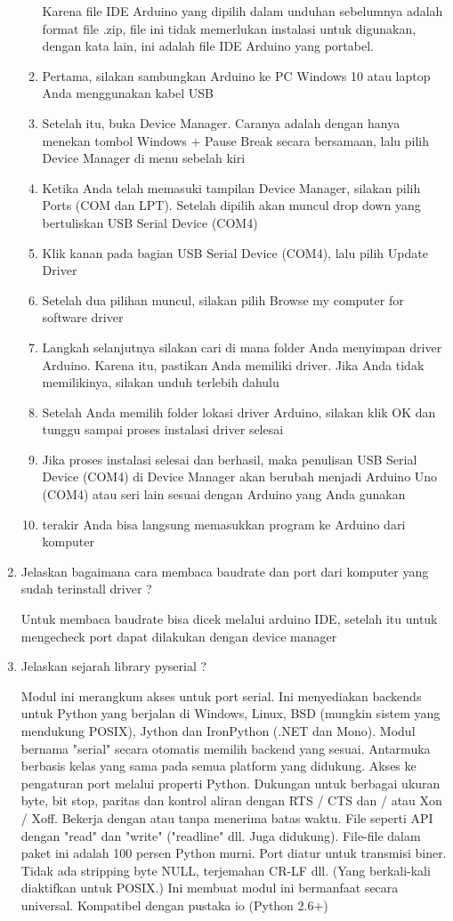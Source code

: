 \begin{enumerate}
\begin{enumerate}
Karena file IDE Arduino yang dipilih dalam unduhan sebelumnya adalah format file .zip, file ini tidak memerlukan instalasi untuk digunakan, dengan kata lain, ini adalah file IDE Arduino yang portabel.
\item Pertama, silakan sambungkan Arduino ke PC Windows 10 atau laptop Anda menggunakan kabel USB
\item Setelah itu, buka Device Manager. Caranya adalah dengan hanya menekan tombol Windows + Pause Break secara bersamaan, lalu pilih Device Manager di menu sebelah kiri
\item Ketika Anda telah memasuki tampilan Device Manager, silakan pilih Ports (COM dan LPT). Setelah dipilih akan muncul drop down yang bertuliskan USB Serial Device (COM4)
\item Klik kanan pada bagian USB Serial Device (COM4), lalu pilih Update Driver
\item Setelah dua pilihan muncul, silakan pilih Browse my computer for software driver
\item Langkah selanjutnya silakan cari di mana folder Anda menyimpan driver Arduino. Karena itu, pastikan Anda memiliki driver. Jika Anda tidak memilikinya, silakan unduh terlebih dahulu
\item Setelah Anda memilih folder lokasi driver Arduino, silakan klik OK dan tunggu sampai proses instalasi driver selesai
\item Jika proses instalasi selesai dan berhasil, maka penulisan USB Serial Device (COM4) di Device Manager akan berubah menjadi Arduino Uno (COM4) atau seri lain sesuai dengan Arduino yang Anda gunakan
\item terakir Anda bisa langsung memasukkan program ke Arduino dari komputer

\end{enumerate}
\item Jelaskan bagaimana cara membaca baudrate dan port dari komputer yang sudah terinstall driver ? 

Untuk membaca baudrate bisa dicek melalui arduino IDE, setelah itu  untuk mengecheck port dapat dilakukan dengan device manager


\item Jelaskan sejarah library pyserial ? 

Modul ini merangkum akses untuk port serial. Ini menyediakan backends untuk Python yang berjalan di Windows, Linux, BSD (mungkin sistem yang mendukung POSIX), Jython dan IronPython (.NET dan Mono). Modul bernama "serial" secara otomatis memilih backend yang sesuai. Antarmuka berbasis kelas yang sama pada semua platform yang didukung.
Akses ke pengaturan port melalui properti Python.
Dukungan untuk berbagai ukuran byte, bit stop, paritas dan kontrol aliran dengan RTS / CTS dan / atau Xon / Xoff.
Bekerja dengan atau tanpa menerima batas waktu.
File seperti API dengan "read" dan "write" ("readline" dll. Juga didukung).
File-file dalam paket ini adalah 100 persen Python murni.
Port diatur untuk transmisi biner. Tidak ada stripping byte NULL, terjemahan CR-LF dll. (Yang berkali-kali diaktifkan untuk POSIX.) Ini membuat modul ini bermanfaat secara universal.
Kompatibel dengan pustaka io (Python 2.6+)


\end{enumerate}
